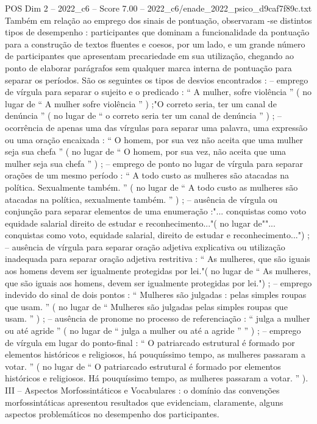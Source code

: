 \begin{textsample}{POS Dim 2 – 2022\_c6 – Score 7.00 – 2022\_c6/enade\_2022\_psico\_d9caf7f89c.txt}
Também em relação ao emprego dos sinais de pontuação, observaram -se distintos tipos de desempenho : participantes que dominam a funcionalidade da pontuação para a construção de textos fluentes e coesos, por um lado, e um grande número de participantes que apresentam precariedade em sua utilização, chegando ao ponto de elaborar parágrafos sem qualquer marca interna de pontuação para separar os períodos.
São os seguintes os tipos de desvios encontrados : – emprego de vírgula para separar o sujeito e o predicado : “ A mulher, sofre violência ” ( no lugar de “ A mulher sofre violência ” ) ;"O correto seria, ter um canal de denúncia ” ( no lugar de “ o correto seria ter um canal de denúncia ” ) ; – ocorrência de apenas uma das vírgulas para separar uma palavra, uma expressão ou uma oração encaixada : “ O homem, por sua vez não aceita que uma mulher seja sua chefa ” ( no lugar de “ O homem, por sua vez, não aceita que uma mulher seja sua chefa ” ) ; – emprego de ponto no lugar de vírgula para separar orações de um mesmo período : “ A todo custo as mulheres são atacadas na política.
Sexualmente também. ” ( no lugar de “ A todo custo as mulheres são atacadas na política, sexualmente também. ” ) ; – ausência de vírgula ou conjunção para separar elementos de uma enumeração :"... conquistas como voto equidade salarial direito de estudar e reconhecimento..."( no lugar de""... conquistas como voto, equidade salarial, direito de estudar e reconhecimento...") ; – ausência de vírgula para separar oração adjetiva explicativa ou utilização inadequada para separar oração adjetiva restritiva : “ As mulheres, que são iguais aos homens devem ser igualmente protegidas por lei."( no lugar de “ As mulheres, que são iguais aos homens, devem ser igualmente protegidas por lei.") ; – emprego indevido do sinal de dois pontos : “ Mulheres são julgadas : pelas simples roupas que usam. ” ( no lugar de “ Mulheres são julgadas pelas simples roupas que usam. ” ) ; – ausência de pronome no processo de referenciação : “ julga a mulher ou até agride ” ( no lugar de “ julga a mulher ou até a agride ” ” ) ; – emprego de vírgula em lugar do ponto-final : “ O patriarcado estrutural é formado por elementos históricos e religiosos, há pouquíssimo tempo, as mulheres passaram a votar. ” ( no lugar de “ O patriarcado estrutural é formado por elementos históricos e religiosos.
Há pouquíssimo tempo, as mulheres passaram a votar. ” ).
III – Aspectos Morfossintáticos e Vocabulares : o domínio das convenções morfossintáticas apresentou resultados que evidenciam, claramente, alguns aspectos problemáticos no desempenho dos participantes.

\end{textsample}
